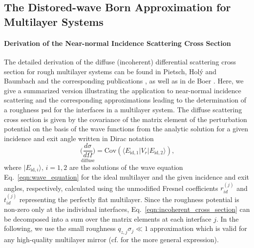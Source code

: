 \subsection{The Distored-wave Born Approximation for Multilayer Systems}
\paragraph{Derivation of the Near-normal Incidence Scattering Cross Section}
The detailed derivation of the diffuse (incoherent) differential scattering cross section for rough multilayer systems can be found in Pietsch, Hol\'{y} and Baumbach \cite{pietsch_high-resolution_2004} and the corresponding publications \cite{sinha_x-ray_1988,holy_nonspecular_1994}, as well as in de Boer \cite{de_boer_x-ray_1996}. Here, we give a summarized version illustrating the application to near-normal incidence scattering and the corresponding approximations leading to the determination of a roughness \gls{psd} for the interfaces in a multilayer system. The diffuse scattering cross section is given by the covariance of the matrix element of the perturbation potential on the basis of the wave functions from the analytic solution for a given incidence and exit angle  written in Dirac notation \cite{dirac_new_1939}
\begin{equation}
        \underset{\text{diffuse}}{\Big(\frac{d \sigma}{d \Omega}\Big)}= \text{Cov}(\langle E_{\text{id},1}| V_r|E_{\text{id},2}\rangle)\text{,} \label{eqn:incoherent_cross_section} 
\end{equation}
where $|E_{\text{id},i}\rangle\text{, }i =1,2$ are the solutions of the wave equation Eq.~\eqref{eqn:wave_equation} for the ideal multilayer and the given incidence and exit angles, respectively, calculated using the unmodified Fresnel coefficients $r_{id}^{(j)}$ and $t_{id}^{(j)}$ representing the perfectly flat multilayer. Since the roughness potential is non-zero only at the individual interfaces, Eq.~\eqref{eqn:incoherent_cross_section} can be decomposed into a sum over the matrix elements at each interface $j$. In the following, we use the small roughness $q_{z,j} \sigma_j \ll 1$ approximation which is valid for any high-quality multilayer mirror (cf. \cite{de_boer_x-ray_1996} for the more general expression).

